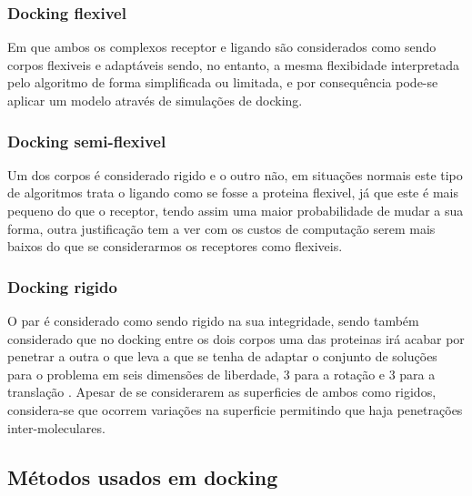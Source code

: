 	\subsubsection{Docking flexivel} Em que ambos os complexos receptor e ligando são considerados como sendo corpos flexiveis e adaptáveis sendo, no entanto, a mesma flexibidade interpretada pelo algoritmo de forma simplificada ou limitada, e por consequência pode-se aplicar um modelo através de simulações de docking.

	\subsubsection{Docking semi-flexivel} Um dos corpos é considerado rigido e o outro não, em situações normais este tipo de algoritmos trata o ligando como se fosse a proteina flexivel, já que este é mais pequeno do que o receptor, tendo assim uma maior probabilidade de mudar a sua forma, outra justificação tem a ver com os custos de computação serem mais baixos do que se considerarmos os receptores como flexiveis.

	\subsubsection{Docking rigido} 
	O par é considerado como sendo rigido na sua integridade, sendo também considerado que no docking entre os dois corpos uma das proteinas irá acabar por penetrar a outra o que leva a que se tenha de adaptar o conjunto de soluções para o problema em seis 		dimensões de liberdade, 3 para a rotação e 3 para a translação \cite{vakser2014protein}. Apesar de se considerarem as superficies de ambos como rigidos, considera-se que ocorrem variações na superficie permitindo que haja penetrações inter-moleculares.
\subsection{Métodos usados em docking}
